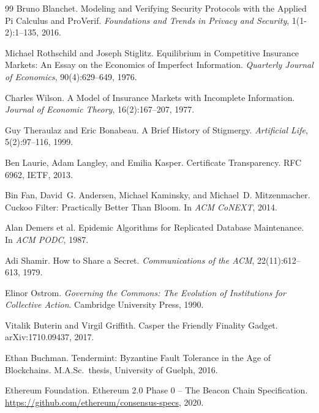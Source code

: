 \documentclass[11pt,a4paper]{article}
\theoremstyle{definition}
\theoremstyle{remark}
\begin{document}
\begin{thebibliography}{99}
Bruno Blanchet.
\newblock Modeling and Verifying Security Protocols with the Applied Pi Calculus and ProVerif.
\newblock \textit{Foundations and Trends in Privacy and Security}, 1(1-2):1--135, 2016.

Michael Rothschild and Joseph Stiglitz.
\newblock Equilibrium in Competitive Insurance Markets: An Essay on the Economics of Imperfect Information.
\newblock \textit{Quarterly Journal of Economics}, 90(4):629--649, 1976.

Charles Wilson.
\newblock A Model of Insurance Markets with Incomplete Information.
\newblock \textit{Journal of Economic Theory}, 16(2):167--207, 1977.

Guy Theraulaz and Eric Bonabeau.
\newblock A Brief History of Stigmergy.
\newblock \textit{Artificial Life}, 5(2):97--116, 1999.

Ben Laurie, Adam Langley, and Emilia Kasper.
\newblock Certificate Transparency.
\newblock RFC 6962, IETF, 2013.

Bin Fan, David~G. Andersen, Michael Kaminsky, and Michael~D. Mitzenmacher.
\newblock Cuckoo Filter: Practically Better Than Bloom.
\newblock In \textit{ACM CoNEXT}, 2014.

Alan Demers et al.
\newblock Epidemic Algorithms for Replicated Database Maintenance.
\newblock In \textit{ACM PODC}, 1987.

Adi Shamir.
\newblock How to Share a Secret.
\newblock \textit{Communications of the ACM}, 22(11):612--613, 1979.

Elinor Ostrom.
\newblock \textit{Governing the Commons: The Evolution of Institutions for Collective Action}.
\newblock Cambridge University Press, 1990.

Vitalik Buterin and Virgil Griffith.
\newblock Casper the Friendly Finality Gadget.
\newblock arXiv:1710.09437, 2017.

Ethan Buchman.
\newblock Tendermint: Byzantine Fault Tolerance in the Age of Blockchains.
\newblock M.A.Sc.\ thesis, University of Guelph, 2016.

Ethereum Foundation.
\newblock Ethereum 2.0 Phase 0 -- The Beacon Chain Specification.
\newblock \url{https://github.com/ethereum/consensus-specs}, 2020.


\end{thebibliography}
\end{document}
